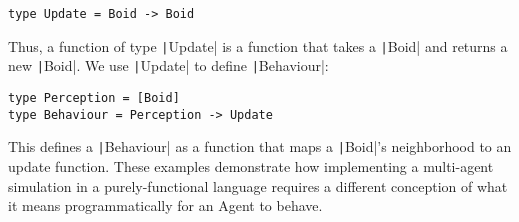 \begin{verbatim}
type Update = Boid -> Boid
\end{verbatim}

Thus, a function of type \texttt|Update| is a function that takes a \texttt|Boid| and returns
a new \texttt|Boid|. We use \texttt|Update| to define \texttt|Behaviour|:

\begin{verbatim}
type Perception = [Boid]
type Behaviour = Perception -> Update
\end{verbatim}

This defines a \texttt|Behaviour| as a function that maps a \texttt|Boid|'s neighborhood to
an update function. These examples demonstrate how implementing a multi-agent
simulation in a purely-functional language requires a different conception of
what it means programmatically for an Agent to behave.

\pagebreak

 
 

